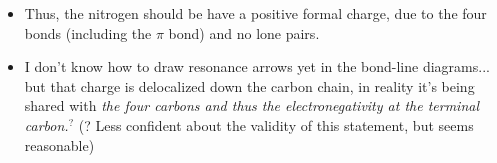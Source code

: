 \documentclass[12pt,a4paper]{article}
\begin{document}
\begin{enumerate}
\begin{itemize}
\begin{itemize}
\begin{itemize}
                \end{itemize}
            \end{itemize}
        \item Thus, the nitrogen should be have a {\color{pos}positive formal} charge, due to the four bonds (including the $\pi$  bond) and no lone pairs.
        \item I don't know how to draw resonance arrows yet in the bond-line diagrams... but that charge is {\color{o-Sun}delocalized} down the carbon chain, in reality it's being shared with {\color{y-Sun}\textit{the four carbons and thus the electronegativity at the terminal carbon.\(^{?}\)}} (? Less confident about the validity of this statement, but seems reasonable)
    \end{itemize}
\end{enumerate}
\newpage
{}
\end{document}
